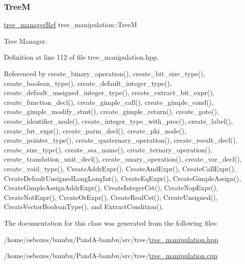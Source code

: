 \subsubsection{\texorpdfstring{TreeM}{TreeM}}
{\footnotesize\ttfamily \hyperlink{tree__manager_8hpp_a96ff150c071ce11a9a7a1e40590f205e}{tree\+\_\+manager\+Ref} tree\+\_\+manipulation\+::\+TreeM\hspace{0.3cm}{\ttfamily [private]}}



Tree Manager. 



Definition at line 112 of file tree\+\_\+manipulation.\+hpp.



Referenced by create\+\_\+binary\+\_\+operation(), create\+\_\+bit\+\_\+size\+\_\+type(), create\+\_\+boolean\+\_\+type(), create\+\_\+default\+\_\+integer\+\_\+type(), create\+\_\+default\+\_\+unsigned\+\_\+integer\+\_\+type(), create\+\_\+extract\+\_\+bit\+\_\+expr(), create\+\_\+function\+\_\+decl(), create\+\_\+gimple\+\_\+call(), create\+\_\+gimple\+\_\+cond(), create\+\_\+gimple\+\_\+modify\+\_\+stmt(), create\+\_\+gimple\+\_\+return(), create\+\_\+goto(), create\+\_\+identifier\+\_\+node(), create\+\_\+integer\+\_\+type\+\_\+with\+\_\+prec(), create\+\_\+label(), create\+\_\+lut\+\_\+expr(), create\+\_\+parm\+\_\+decl(), create\+\_\+phi\+\_\+node(), create\+\_\+pointer\+\_\+type(), create\+\_\+quaternary\+\_\+operation(), create\+\_\+result\+\_\+decl(), create\+\_\+size\+\_\+type(), create\+\_\+ssa\+\_\+name(), create\+\_\+ternary\+\_\+operation(), create\+\_\+translation\+\_\+unit\+\_\+decl(), create\+\_\+unary\+\_\+operation(), create\+\_\+var\+\_\+decl(), create\+\_\+void\+\_\+type(), Create\+Addr\+Expr(), Create\+And\+Expr(), Create\+Call\+Expr(), Create\+Default\+Unsigned\+Long\+Long\+Int(), Create\+Eq\+Expr(), Create\+Gimple\+Assign(), Create\+Gimple\+Assign\+Addr\+Expr(), Create\+Integer\+Cst(), Create\+Nop\+Expr(), Create\+Not\+Expr(), Create\+Or\+Expr(), Create\+Real\+Cst(), Create\+Unsigned(), Create\+Vector\+Boolean\+Type(), and Extract\+Condition().



The documentation for this class was generated from the following files\+:\begin{DoxyCompactItemize}
\item 
/home/osboxes/bambu/\+Pand\+A-\/bambu/src/tree/\hyperlink{tree__manipulation_8hpp}{tree\+\_\+manipulation.\+hpp}\item 
/home/osboxes/bambu/\+Pand\+A-\/bambu/src/tree/\hyperlink{tree__manipulation_8cpp}{tree\+\_\+manipulation.\+cpp}\end{DoxyCompactItemize}

